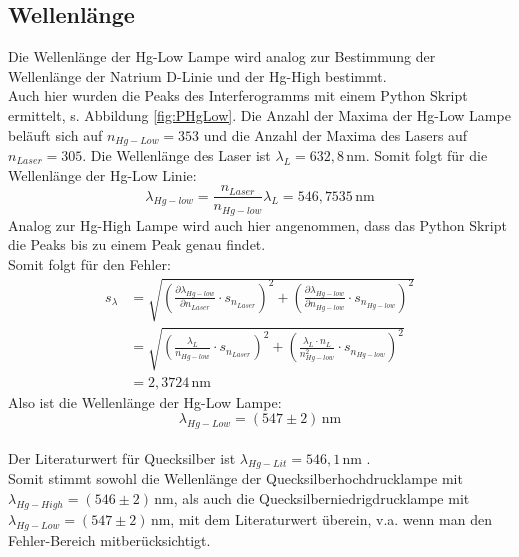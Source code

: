 \subsection{Wellenlänge}
Die Wellenlänge der Hg-Low Lampe wird analog zur Bestimmung der Wellenlänge der Natrium D-Linie und der Hg-High bestimmt.\\
Auch hier wurden die Peaks des Interferogramms mit einem Python Skript ermittelt, s. Abbildung \ref{fig:PHgLow}. 
Die Anzahl der Maxima der Hg-Low Lampe beläuft sich auf $n_{Hg-Low} = 353$ und die Anzahl der Maxima des Lasers 
auf $n_{Laser} = 305$. Die Wellenlänge des Laser ist $\lambda_L = 632,8\,$nm. Somit folgt für die Wellenlänge
der Hg-Low Linie:
\begin{equation}
    \lambda_{Hg-low} = \frac{n_{Laser}}{n_{Hg-low}} \lambda_L = 546,7535\,\text{nm}
\end{equation}
Analog zur Hg-High Lampe wird auch hier angenommen, dass das Python Skript die Peaks 
bis zu einem Peak genau findet. \\
Somit folgt für den Fehler:
\begin{align}
    s_{\lambda} &= \sqrt{\left( \frac{\partial \lambda_{Hg-low}}{\partial n_{Laser}}\cdot s_{n_{Laser}}\right)^2+ \left(\frac{\partial \lambda_{Hg-low}}{\partial n_{Hg-low}}\cdot s_{n_{Hg-low}}\right)^2}\\
                &= \sqrt{\left(\frac{\lambda_L}{n_{Hg-low}} \cdot s_{n_{Laser}}\right)^2 + \left(\frac{\lambda_L \cdot n_L}{n^2_{Hg-low}} \cdot s_{n_{Hg-low}}\right)^2 }\\
                &= 2,3724\,\text{nm}
\end{align}
Also ist die Wellenlänge der Hg-Low Lampe:
\begin{equation}
    \lambda_{Hg-Low} = (547 \pm 2)\,\text{nm}
\end{equation}\\
Der Literaturwert für Quecksilber ist $\lambda_{Hg-Lit} = 546,1\,$nm \citep[vgl.][]{Zusatzliteratur}.\\
Somit stimmt sowohl die Wellenlänge der Quecksilberhochdrucklampe mit $\lambda_{Hg-High} = (546 \pm 2)\,\text{nm}$, als 
auch die Quecksilberniedrigdrucklampe mit $\lambda_{Hg-Low} = (547 \pm 2)\,\text{nm}$, mit dem Literaturwert überein, v.a.
wenn man den Fehler-Bereich mitberücksichtigt.
